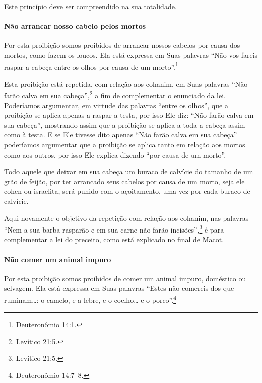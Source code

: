 \begin{multicols}{2}
Este princípio deve ser compreendido na sua totalidade.

\paragraph{Não arrancar nosso cabelo pelos mortos}

Por esta proibição somos proibidos de arrancar nossos cabelos por causa
dos mortos, como fazem os loucos. Ela está expressa em Suas palavras
``Não vos fareis raspar a cabeça entre os olhos por causa de um morto''.\footnote{Deuteronômio 14:1.}

Esta proibição está repetida, com relação aos cohanim\starr, em Suas
palavras ``Não farão calva em sua cabeça'',\footnote{Levítico 21:5.} a fim de
complementar o enunciado da lei. Poderíamos argumentar, em virtude das
palavras ``entre os olhos'', que a proibição se aplica apenas a raspar a
testa, por isso Ele diz: ``Não farão calva em sua cabeça'', mostrando
assim que a proibição se aplica a toda a cabeça assim como à testa. E se
Ele tivesse dito apenas ``Não farão calva em sua cabeça'' poderíamos
argumentar que a proibição se aplica tanto em relação aos mortos como
aos outros, por isso Ele explica dizendo ``por causa de um morto''.

Todo aquele que deixar em sua cabeça um buraco de calvície do tamanho de
um grão de feijão, por ter arrancado seus cabelos por causa de um morto,
seja ele cohen\starr{} ou israelita, será punido com o açoitamento, uma vez
por cada buraco de calvície.

Aqui novamente o objetivo da repetição com relação aos cohanim\starr, nas
palavras ``Nem a sua barba rasparão e em sua carne não farão incisões'',\footnote{Levítico 21:5.} é para complementar a lei do preceito, como está
explicado no final de Macot\starr.

\paragraph{Não comer um animal impuro}

Por esta proibição somos proibidos de comer um animal impuro, doméstico
ou selvagem. Ela está expressa em Suas palavras ``Estes não comereis
dos que ruminam\ldots{}: o camelo, e a lebre, e o coelho\ldots{} e o porco''.\footnote{Deuteronômio 14:7--8.}


\end{multicols}
